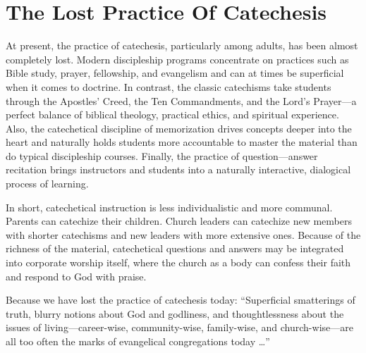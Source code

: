 \documentclass[00-main.tex]{subfiles}
\begin{document}
\section{The Lost Practice Of Catechesis}
At present, the practice of catechesis, particularly among adults, has been almost completely lost. Modern discipleship programs concentrate on practices such as Bible study, prayer, fellowship, and evangelism and can at times be superficial when it comes to doctrine. In contrast, the classic catechisms take students through the Apostles' Creed, the Ten Commandments, and the Lord's Prayer\thinspace{}---\thinspace{}a perfect balance of biblical theology, practical ethics, and spiritual experience. Also, the catechetical discipline of memorization drives concepts deeper into the heart and naturally holds students more accountable to master the material than do typical discipleship courses. Finally, the practice of question\thinspace{}---\thinspace{}answer recitation brings instructors and students into a naturally interactive, dialogical process of learning.

In short, catechetical instruction is less individualistic and more communal. Parents can catechize their children. Church leaders can catechize new members with shorter catechisms and new leaders with more extensive ones. Because of the richness of the material, catechetical questions and answers may be integrated into corporate worship itself, where the church as a body can confess their faith and respond to God with praise.

Because we have lost the practice of catechesis today: ``Superficial smatterings of truth, blurry notions about God and godliness, and thoughtlessness about the issues of living\thinspace{}---\thinspace{}career-wise, community-wise, family-wise, and church-wise\thinspace{}---\thinspace{}are all too often the marks of evangelical congregations today {\dots}'' \cite{Gary-Parrett:2010}  
\end{document}
